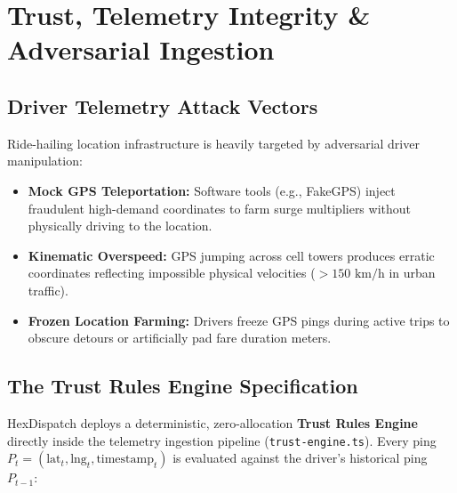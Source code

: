 \documentclass[11pt,a4paper]{article}
\begin{document}
\section{Trust, Telemetry Integrity \& Adversarial Ingestion}

\subsection{Driver Telemetry Attack Vectors}
Ride-hailing location infrastructure is heavily targeted by adversarial driver manipulation:
\begin{itemize}[leftmargin=1.5em]
    \item \textbf{Mock GPS Teleportation:} Software tools (e.g., FakeGPS) inject fraudulent high-demand coordinates to farm surge multipliers without physically driving to the location.
    \item \textbf{Kinematic Overspeed:} GPS jumping across cell towers produces erratic coordinates reflecting impossible physical velocities ($> 150\text{ km/h}$ in urban traffic).
    \item \textbf{Frozen Location Farming:} Drivers freeze GPS pings during active trips to obscure detours or artificially pad fare duration meters.
\end{itemize}

\subsection{The Trust Rules Engine Specification}
HexDispatch deploys a deterministic, zero-allocation \textbf{Trust Rules Engine} directly inside the telemetry ingestion pipeline (\texttt{trust-engine.ts}). Every ping $P_t = (\text{lat}_t, \text{lng}_t, \text{timestamp}_t)$ is evaluated against the driver's historical ping $P_{t-1}$:
\end{document}
